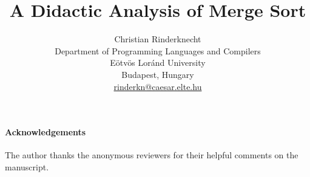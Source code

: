 \documentclass[11pt,a4paper]{article}
\title{A Didactic Analysis of Merge Sort}
\author{Christian Rinderknecht\\
\small Department of Programming Languages and Compilers\\
\small E\"otv\"os Lor\'and University\\
\small Budapest, Hungary\\
\small \url{rinderkn@caesar.elte.hu}}
\date{}
\theoremstyle{plain}
\begin{document}
\maketitle

\allowdisplaybreaks











\medskip

\paragraph{Acknowledgements} The author thanks the anonymous reviewers
for their helpful comments on the manuscript.



\end{document}
